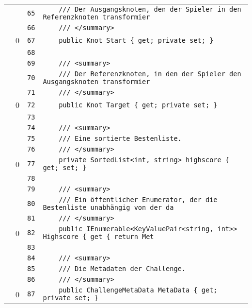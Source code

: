 \documentclass[a4paper,10pt]{article}
\begin{document}
\begin{longtable}[l]{lrrl}
\cellcolor{gray} &  & \verb~65~ & \verb~    /// Der Ausgangsknoten, den der Spieler in den Referenzknoten transformier~\\
\cellcolor{gray} &  & \verb~66~ & \verb~    /// </summary>~\\
\cellcolor{red} & 0 & \verb~67~ & \verb~    public Knot Start { get; private set; }~\\
\cellcolor{gray} &  & \verb~68~ & \verb~~\\
\cellcolor{gray} &  & \verb~69~ & \verb~    /// <summary>~\\
\cellcolor{gray} &  & \verb~70~ & \verb~    /// Der Referenzknoten, in den der Spieler den Ausgangsknoten transformier~\\
\cellcolor{gray} &  & \verb~71~ & \verb~    /// </summary>~\\
\cellcolor{red} & 0 & \verb~72~ & \verb~    public Knot Target { get; private set; }~\\
\cellcolor{gray} &  & \verb~73~ & \verb~~\\
\cellcolor{gray} &  & \verb~74~ & \verb~    /// <summary>~\\
\cellcolor{gray} &  & \verb~75~ & \verb~    /// Eine sortierte Bestenliste.~\\
\cellcolor{gray} &  & \verb~76~ & \verb~    /// </summary>~\\
\cellcolor{red} & 0 & \verb~77~ & \verb~    private SortedList<int, string> highscore { get; set; }~\\
\cellcolor{gray} &  & \verb~78~ & \verb~~\\
\cellcolor{gray} &  & \verb~79~ & \verb~    /// <summary>~\\
\cellcolor{gray} &  & \verb~80~ & \verb~    /// Ein öffentlicher Enumerator, der die Bestenliste unabhängig von der da~\\
\cellcolor{gray} &  & \verb~81~ & \verb~    /// </summary>~\\
\cellcolor{red} & 0 & \verb~82~ & \verb~    public IEnumerable<KeyValuePair<string, int>> Highscore { get { return Met~\\
\cellcolor{gray} &  & \verb~83~ & \verb~~\\
\cellcolor{gray} &  & \verb~84~ & \verb~    /// <summary>~\\
\cellcolor{gray} &  & \verb~85~ & \verb~    /// Die Metadaten der Challenge.~\\
\cellcolor{gray} &  & \verb~86~ & \verb~    /// </summary>~\\
\cellcolor{red} & 0 & \verb~87~ & \verb~    public ChallengeMetaData MetaData { get; private set; }~\\

\end{longtable}
\end{document}
